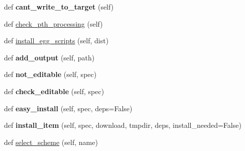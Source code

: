 \begin{DoxyCompactItemize}
\mbox{\label{classsetuptools_1_1command_1_1easy__install_1_1easy__install_acf85cf14b68a1509b1c0d64d5cde9fab}} 
def {\bfseries cant\+\_\+write\+\_\+to\+\_\+target} (self)
\item 
def \hyperlink{classsetuptools_1_1command_1_1easy__install_1_1easy__install_a3f116d374421c4d34fc75bdd96952f39}{check\+\_\+pth\+\_\+processing} (self)
\item 
def \hyperlink{classsetuptools_1_1command_1_1easy__install_1_1easy__install_a9f5abab719e7bae26b43d2f823bc52c0}{install\+\_\+egg\+\_\+scripts} (self, dist)
\item 
\mbox{\label{classsetuptools_1_1command_1_1easy__install_1_1easy__install_aaf0949c3bcc6f3247e0c87b5dff2a070}} 
def {\bfseries add\+\_\+output} (self, path)
\item 
\mbox{\label{classsetuptools_1_1command_1_1easy__install_1_1easy__install_acc62163c8fa871e362c99f99bcba1326}} 
def {\bfseries not\+\_\+editable} (self, spec)
\item 
\mbox{\label{classsetuptools_1_1command_1_1easy__install_1_1easy__install_a2c472da3ca0e63cd65ee61e2f5429aa8}} 
def {\bfseries check\+\_\+editable} (self, spec)
\item 
\mbox{\label{classsetuptools_1_1command_1_1easy__install_1_1easy__install_ac31f17115e3242d7bb4a09f30d917682}} 
def {\bfseries easy\+\_\+install} (self, spec, deps=False)
\item 
\mbox{\label{classsetuptools_1_1command_1_1easy__install_1_1easy__install_a436bb487b6dcb071193cdf4cc5dd9f3b}} 
def {\bfseries install\+\_\+item} (self, spec, download, tmpdir, deps, install\+\_\+needed=False)
\item 
def \hyperlink{classsetuptools_1_1command_1_1easy__install_1_1easy__install_a0497878cc23ab12f8e7f1ddef60c0817}{select\+\_\+scheme} (self, name)
\item 
\mbox{\label{classsetuptools_1_1command_1_1easy__install_1_1easy__install_a4c4983dc2ff927d50c67f182caa2fd38}} 

\end{DoxyCompactItemize}
